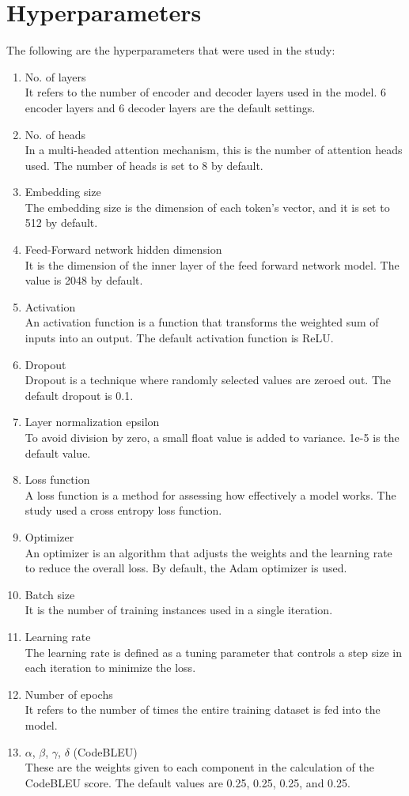 \section{Hyperparameters}
The following are the hyperparameters that were used in the study:
\begin{enumerate}[topsep = 0pt, label=\roman*.]
\item No. of layers \\It refers to the number of encoder and decoder layers used in the model. 6 encoder layers and 6 decoder layers are the default settings.
\item No. of heads \\In a multi-headed attention mechanism, this is the number of attention heads used. The number of heads is set to 8 by default. 
\item Embedding size \\The embedding size is the dimension of each token's vector, and it is set to 512 by default. 
\item Feed-Forward network hidden dimension \\It is the dimension of the inner layer of the feed forward network model. The value is 2048 by default.
\item Activation \\An activation function is a function that transforms the weighted sum of inputs into an output. The default activation function is ReLU.
\item Dropout \\Dropout is a technique where randomly selected values are zeroed out. The default dropout is 0.1.
\item Layer normalization epsilon \\To avoid division by zero, a small float value is added to variance.
1e-5 is the default value. 
\item Loss function \\A loss function is a method for assessing how effectively a model works. The study used a cross entropy loss function.
\item Optimizer \\An optimizer is an algorithm that adjusts the weights and the learning rate to reduce the overall loss. By default, the Adam optimizer is used.
\item Batch size \\It is the number of training instances used in a single iteration.
\item Learning rate \\The learning rate is defined as a tuning parameter that controls a step size in each iteration to minimize the loss.
\item Number of epochs \\It refers to the number of times the entire training dataset is fed into the model. 
\item $\alpha$, $\beta$, $\gamma$, $\delta$ (CodeBLEU) \\These are the weights given to each component in the calculation of the CodeBLEU score. The default values are 0.25, 0.25, 0.25, and 0.25.
\end{enumerate}
